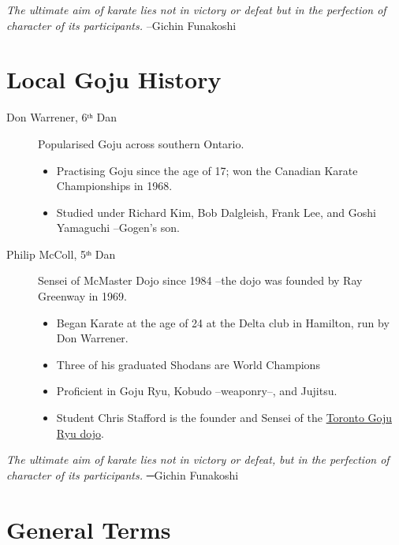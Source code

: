 \documentclass[11pt]{article}
\begin{document}
\begin{center}
\emph{The ultimate aim of karate lies not in victory or defeat but in the perfection of character of its participants.}
–Gichin Funakoshi
\end{center}

\newpage

\section{Local Goju History}
\label{sec:org47cf233}
\begin{description}
\item[{Don Warrener, 6ᵗʰ Dan}] Popularised Goju across southern Ontario.
\begin{itemize}
\item Practising Goju since the age of 17; won the Canadian Karate Championships in 1968.
\item Studied under Richard Kim, Bob Dalgleish, Frank Lee, and 
Goshi Yamaguchi --Gogen's son.
\end{itemize}

\item[{Philip McColl, 5ᵗʰ Dan}] Sensei of McMaster Dojo since 1984
--the dojo was founded by Ray Greenway in 1969.
\begin{itemize}
\item Began Karate at the age of 24 at the Delta club in Hamilton, run by Don Warrener.
\item Three of his graduated Shodans are World Champions
\item Proficient in Goju Ryu, Kobudo --weaponry--, and Jujitsu.
\item Student Chris Stafford is the founder and Sensei of the \href{http://torontokarate.ca/}{Toronto Goju Ryu dojo}.
\end{itemize}
\end{description}

\begin{center}
\emph{The ultimate aim of karate lies not in victory or defeat,}
\emph{but in the perfection of character of its participants.}
─Gichin Funakoshi
\end{center}

\section{General Terms}
\label{sec:org4a243ce}
\end{document}
